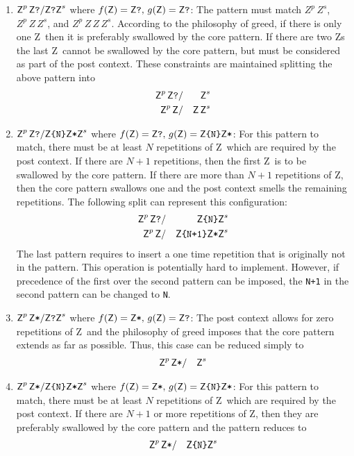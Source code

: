 \documentclass[acmtoplas]{acmtrans2m}
\newcommand{\pZ}{{\sf Z}}
\newcommand{\mpZ}{\mbox{\sf Z}}
\newcommand{\mpZp}[3] {\mpZ^p\,\mpZ\mbox{\tt #1} #3/ #3 \mbox{\tt #2} \mpZ^s}
\newcommand{\mpZpi}[1]{\mpZp{#1}{\pZ\{N\}\pZ*}{}}
\newcommand{\mpZpo}[1]{\mpZp{#1}{\pZ?}{}}
\begin{document}
\begin{enumerate}
\item $\mpZpo{?}$ where $f(\mpZ)=\mbox{\pZ\tt?},\,g(\mpZ)=\mbox{\pZ\tt?}$: 
     The pattern must match $Z^p\,Z^s$, $Z^p\,Z\,Z^s$, and $Z^p\,Z\,Z\,Z^s$. According to the philosophy
     of greed, if there is only one \pZ\ then it is preferably swallowed by the core pattern.
     If there are two \pZ{}s the last \pZ\ cannot be swallowed by the core pattern, but must
     be considered as part of the post context. These constraints are maintained splitting the
     above pattern into 
     \begin{eqnarray}
              \mpZp{?}{}{&}
     \\
              \mpZp{}{\pZ$\,$}{&}
     \end{eqnarray}


\item $\mpZpi{?}$ where $f(\mpZ)=\mbox{\pZ\tt?},\,g(\mpZ)=\mbox{\pZ \tt\{N\}\pZ\tt *}$:
    For this pattern to match, there must be at least $N$ repetitions of \pZ\ which
    are required by the post context. If there are $N+1$ repetitions, then the first \pZ\ 
    is to be swallowed by the core pattern. If there are more than $N+1$ repetitions
    of \pZ, then the core pattern swallows one and the post context smells the remaining
    repetitions. The following split can represent this configuration:
     \begin{eqnarray}
              \mpZp{?}{\pZ\{N\}}{&}
     \\
              \mpZp{}{\pZ\{N+1\}\pZ*}{&}
     \end{eqnarray}
     The last pattern requires to insert a one time repetition that
    is originally not in the pattern. This operation is potentially hard to implement. However,
    if precedence of the first over the second pattern can be imposed, the {\tt N+1} in the
    second pattern can be changed to {\tt N}.


\item $\mpZpo{*}$ where $f(\mpZ)=\mbox{\pZ\tt*},\,g(\mpZ)=\mbox{\pZ\tt?}$: The post context
     allows for zero repetitions of \pZ\  and the philosophy of greed imposes that the core
     pattern extends as far as possible. Thus, this case can be reduced simply to
     \begin{eqnarray}
              \mpZp{*}{}{&}
     \end{eqnarray}


\item $\mpZpi{*}$ where $f(\mpZ)=\mbox{\pZ\tt*},\,g(\mpZ)=\mbox{\pZ\tt\{N\}\pZ*}$: 
    For this pattern to match, there must be at least $N$ repetitions of \pZ\  which
    are required by the post context. If there are $N+1$ or more repetitions
    of \pZ, then they are preferably swallowed by the core pattern and the 
    pattern reduces to
     \begin{eqnarray}
              \mpZp{*}{\pZ\{N\}}{&}
     \end{eqnarray}

\end{enumerate}
\end{document}

